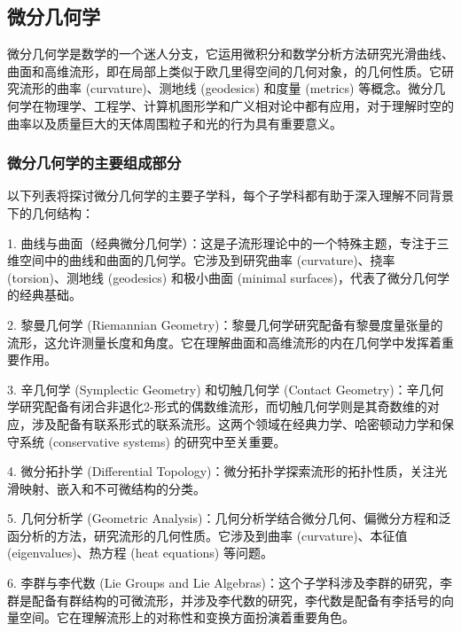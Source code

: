 
\begin{issues}
\issueAi
\end{issues}

\subsection{微分几何学}

微分几何学是数学的一个迷人分支，它运用微积分和数学分析方法研究光滑曲线、曲面和高维流形，即在局部上类似于欧几里得空间的几何对象，的几何性质。它研究流形的曲率 (curvature)、测地线 (geodesics) 和度量 (metrics) 等概念。微分几何学在物理学、工程学、计算机图形学和广义相对论中都有应用，对于理解时空的曲率以及质量巨大的天体周围粒子和光的行为具有重要意义。

\subsubsection{微分几何学的主要组成部分}

以下列表将探讨微分几何学的主要子学科，每个子学科都有助于深入理解不同背景下的几何结构：

1. 曲线与曲面（经典微分几何学）：这是子流形理论中的一个特殊主题，专注于三维空间中的曲线和曲面的几何学。它涉及到研究曲率 (curvature)、挠率 (torsion)、测地线 (geodesics) 和极小曲面 (minimal surfaces)，代表了微分几何学的经典基础。

2. 黎曼几何学 (Riemannian Geometry)：黎曼几何学研究配备有黎曼度量张量的流形，这允许测量长度和角度。它在理解曲面和高维流形的内在几何学中发挥着重要作用。

3. 辛几何学 (Symplectic Geometry) 和切触几何学 (Contact Geometry)：辛几何学研究配备有闭合非退化2-形式的偶数维流形，而切触几何学则是其奇数维的对应，涉及配备有联系形式的联系流形。这两个领域在经典力学、哈密顿动力学和保守系统 (conservative systems) 的研究中至关重要。

4. 微分拓扑学 (Differential Topology)：微分拓扑学探索流形的拓扑性质，关注光滑映射、嵌入和不可微结构的分类。

5. 几何分析学 (Geometric Analysis)：几何分析学结合微分几何、偏微分方程和泛函分析的方法，研究流形的几何性质。它涉及到曲率 (curvature)、本征值 (eigenvalues)、热方程 (heat equations) 等问题。

6. 李群与李代数 (Lie Groups and Lie Algebras)：这个子学科涉及李群的研究，李群是配备有群结构的可微流形，并涉及李代数的研究，李代数是配备有李括号的向量空间。它在理解流形上的对称性和变换方面扮演着重要角色。

